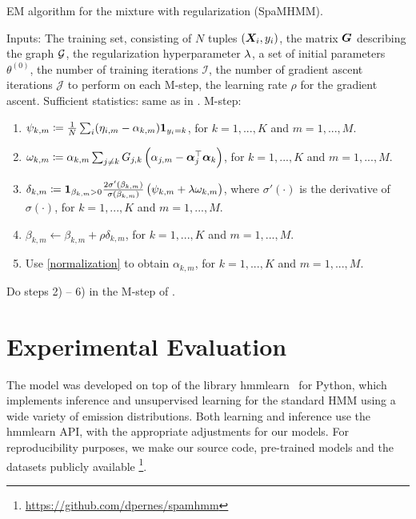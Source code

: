 \begin{algorithm}
	\caption{EM algorithm for the mixture with regularization (SpaMHMM).}
	\label{alg:spamhmm}
	\begin{algorithmic}
		\State Inputs: The training set, consisting of $N$ tuples $({\bm{X}}_i,y_i)$, the matrix ${\bm{G}}$ describing the graph ${\mathcal{G}}$, the regularization hyperparameter $\lambda$, a set of initial parameters $\theta^{(0)}$, the number of training iterations $\mathcal{I}$, the number of gradient ascent iterations $\mathcal{J}$ to perform on each M-step, the learning rate $\rho$ for the gradient ascent.
		\State Sufficient statistics: same as in .
		\State M-step:
		\begin{enumerate}
			\item $\psi_{k,m} \coloneqq \frac{1}{N}\sum_i (\eta_{i,m} - \alpha_{k,m}) \bm{1}_{y_i=k}$, for $k=1,...,K$ and $m=1,...,M$.
			\item $\omega_{k,m} \coloneqq \alpha_{k,m} \sum_{j \neq k} {G}_{j,k}\left(\alpha_{j,m} - {\bm{\alpha}}_j ^\top {\bm{\alpha}}_k \right)$, for $k=1,...,K$ and $m=1,...,M$.
			\item $\delta_{k,m} \coloneqq \bm{1}_{\beta_{k,m} > 0} \frac{2\sigma'(\beta_{k,m})}{\sigma(\beta_{k,m})}\left(\psi_{k,m} + \lambda \omega_{k,m}\right)$, where $\sigma'(\cdot)$ is the derivative of $\sigma(\cdot)$, for $k=1,...,K$ and $m=1,...,M$. 
			\item $\beta_{k,m} \leftarrow \beta_{k,m} + \rho \delta_{k,m}$, for $k=1,...,K$ and $m=1,...,M$.
			\item Use \eqref{normalization} to obtain $\alpha_{k,m}$, for $k=1,...,K$ and $m=1,...,M$.
		\end{enumerate}
		\EndFor
		\State Do steps 2) -- 6) in the M-step of . 
		\EndFor
	\end{algorithmic}
\end{algorithm}

\section{Experimental Evaluation}
\label{sec:experiments}
The model was developed on top of the library hmmlearn~\cite{hmmlearn} for Python, which implements inference and unsupervised learning for the standard HMM using a wide variety of emission distributions. Both learning and inference use the hmmlearn API, with the appropriate adjustments for our models. For reproducibility purposes, we make our source code, pre-trained models and the datasets publicly available \footnote{\url{https://github.com/dpernes/spamhmm}}.

